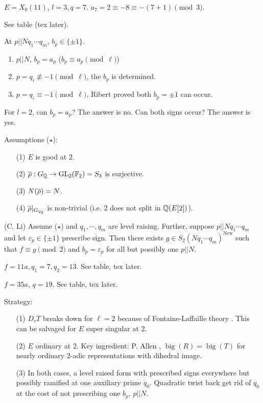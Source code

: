 \documentclass[12pt,amsfont]{amsart}
\begin{document}
\begin{xmp} $E = X_0(11)$, $l = 3, q = 7$. $a_7 = 2 \equiv -8 \equiv -(7+1) \pmod{3}$. 

See table (tex later).

\end{xmp}

\begin{rmk} At $p || Nq_1 \cdots q_m$, $b_p \in \{\pm 1\}$. 
{\ }
\begin{enumerate}
\item
$p || N$, $b_p = a_p$ ($b_p \equiv a_p \pmod{\ell}$)
\item
$p = q_i \not \equiv -1 \pmod{\ell}$, the $b_p$ is determined.
\item
$p = q_i \equiv -1 \pmod{\ell}$, Ribert proved both $b_p = \pm 1$ can occur.

\end{enumerate}
For $l = 2$, can $b_p = a_p$? The answer is no. Can both signs occur? The answer is yes.
\end{rmk}

Assumptions ($\star$):
{\ }
\begin{enumerate}
\item[(1)]
$E$ is good at 2.
\item[(2)]
$\overline{\rho} : G_{\mathbb Q} \rightarrow \operatorname{GL}_2({\mathbb F}_2) = S_3$ is surjective. 
\item[(3)]
$N(\overline{\rho}) = N$.
\item[(4)]
$\overline{\rho} |_{G_{{\mathbb Q}_2}}$ is non-trivial (i.e. $2$ does not split in ${\mathbb Q}(E[2])$).
\end{enumerate}

\begin{thm} (C. Li) Assume ($\star$) and $q_1, \cdots, q_m$ are level raising. Further, suppose $p || Nq_1 \cdots q_m$ and let $\varepsilon_p \in \{\pm 1\}$ prescribe sign. Then there exists $g \in S_2(Nq_1 \cdots q_m)^{\text{New}}$ such that $f \equiv g \pmod{2}$ and $b_p = \varepsilon_p$ for all but possibly one $p || N$.  
\end{thm}

\begin{xmp} $f = 11a, q_1 = 7, q_2 = 13$. See table, tex later.
\end{xmp}

\begin{xmp} $f = 35a$, $q = 19$. See table, tex later.
\end{xmp}

Strategy: 
{\ }
\begin{enumerate}
\item[(1)]
$D_\tau T$ breaks down for $\ell=2$ because of Fontaine-Laffaille theory . This can be salvaged for $E$ super singular at $2$. 
\item[(2)]
$E$ ordinary at $2$. Key ingredient: P. Allen , $\operatorname{big}(R) = \operatorname{big}(T)$ for nearly ordinary $2$-adic representations with dihedral image. 
\item[(3)]
In both cases, a level raised form with prescribed signs everywhere but possibly ramified at one auxiliary prime $q_0$. Quadratic twist back get rid of $q_0$ at the cost of not prescribing one $b_p$, $p || N$. 
\end{enumerate} 
\end{document}
